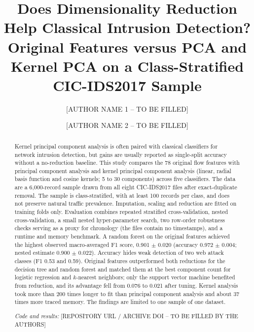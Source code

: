 \documentclass[runningheads]{llncs}
\begin{document}
\title{Does Dimensionality Reduction Help Classical Intrusion Detection? Original Features versus PCA and Kernel PCA on a Class-Stratified CIC-IDS2017 Sample}
\author{[AUTHOR NAME 1 -- TO BE FILLED] \and [AUTHOR NAME 2 -- TO BE FILLED]}
\maketitle
\begin{abstract}
Kernel principal component analysis is often paired with classical classifiers for network intrusion detection, but gains are usually reported as single-split accuracy without a no-reduction baseline. This study compares the 78 original flow features with principal component analysis and kernel principal component analysis (linear, radial basis function and cosine kernels; 5 to 30 components) across five classifiers. The data are a 6,000-record sample drawn from all eight CIC-IDS2017 files after exact-duplicate removal. The sample is class-stratified, with at least 100 records per class, and does not preserve natural traffic prevalence. Imputation, scaling and reduction are fitted on training folds only. Evaluation combines repeated stratified cross-validation, nested cross-validation, a small nested hyper-parameter search, two row-order robustness checks serving as a proxy for chronology (the files contain no timestamps), and a runtime and memory benchmark. A random forest on the original features achieved the highest observed macro-averaged F1 score, 0.901 $\pm$ 0.020 (accuracy 0.972 $\pm$ 0.004; nested estimate 0.900 $\pm$ 0.022). Accuracy hides weak detection of two web attack classes (F1 0.53 and 0.59). Original features outperformed both reductions for the decision tree and random forest and matched them at the best component count for logistic regression and $k$-nearest neighbors; only the support vector machine benefited from reduction, and its advantage fell from 0.076 to 0.021 after tuning. Kernel analysis took more than 200 times longer to fit than principal component analysis and about 37 times more traced memory. The findings are limited to one sample of one dataset.

\vspace{2pt}\noindent\textit{Code and results:} [REPOSITORY URL / ARCHIVE DOI -- TO BE FILLED BY THE AUTHORS]
\end{abstract}
\end{document}
